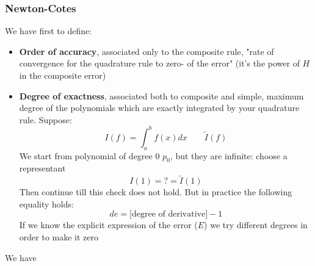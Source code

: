 \subsubsection{Newton-Cotes}
We have first to define:
\begin{itemize}
    \item \textbf{Order of accuracy}, associated only to the composite rule, "rate of convergence for the quadrature rule to zero- of the error" (it's the power of $H$ in the composite error)
    \item \textbf{Degree of exactness}, associated both to composite and simple, maximum degree of the polynomials which are exactly integrated by your quadrature rule. Suppose:
    $$
    I(f)=\int_a^bf(x)dx\qquad\tilde{I}(f)
    $$
    We start from polynomial of degree 0 $p_0$, but they are infinite: choose a representant
    $$
    I(1)=?=\tilde{I}(1)
    $$
    Then continue till this check does not hold. But in practice the following equality holds:
    $$
    de=\text{[degree of derivative]}-1
    $$
    If we know the explicit expression of the error ($E$) we try different degrees in order to make it zero
\end{itemize}
We have

